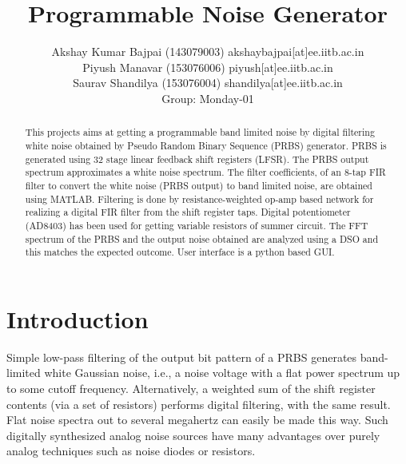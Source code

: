 \documentclass[a4paper,12pt]{article}
\begin{document}
\begin{titlepage}

\end{titlepage}
\title
	{
		Programmable Noise Generator
	}
\author
	{
		Akshay Kumar Bajpai (143079003) akshaybajpai[at]ee.iitb.ac.in\\
		Piyush Manavar (153076006) piyush[at]ee.iitb.ac.in	\\
		Saurav Shandilya (153076004) shandilya[at]ee.iitb.ac.in\\
		Group: Monday-01
	}

\maketitle


\begin{abstract}
 	This projects aims at getting a programmable band limited noise by digital filtering white noise obtained by Pseudo Random Binary Sequence (PRBS) generator. PRBS is generated using 32 stage linear feedback shift registers (LFSR). The PRBS output spectrum approximates a white noise spectrum. The filter coefficients, of an 8-tap FIR filter to convert the white noise (PRBS output) to band limited noise, are obtained using MATLAB. Filtering is done by resistance-weighted op-amp based network for realizing a digital FIR filter from the shift register taps. Digital potentiometer (AD8403) has been used for getting variable resistors of summer circuit. The FFT spectrum of the PRBS and the output noise obtained are analyzed using a DSO and this matches the expected outcome. User interface is a python based GUI.

\end{abstract}


\section{Introduction}

Simple low-pass filtering of the output bit pattern of a PRBS generates band-limited white Gaussian noise, i.e., a noise voltage with a flat power spectrum up to some cutoff frequency. Alternatively, a weighted sum of the shift register contents (via a set of resistors) performs digital filtering, with the same result. Flat noise spectra out to several megahertz can easily be made this way. Such digitally synthesized analog noise sources have many advantages over purely analog techniques such as noise diodes or resistors.
\end{document}
